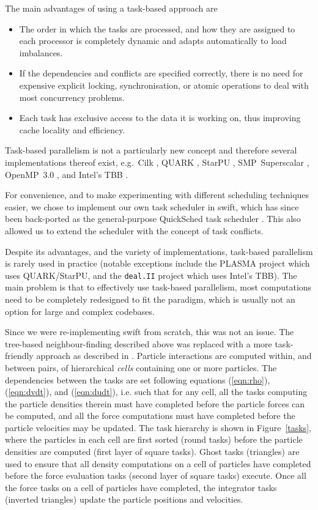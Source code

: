 \documentclass{sig-alternate-05-2015}
\newcommand{\eqn}[1] {(\ref{eqn:#1})}
\newcommand{\swift}{{\sc swift}\xspace}
\newcommand{\qs}{{\sc QuickSched}\xspace}
\begin{document}
The main advantages of using a task-based approach are
%
\begin{itemize}
    \item The order in which the tasks are processed, and how they
        are assigned to each processor is completely
        dynamic and adapts automatically to load imbalances.
    \item If the dependencies and conflicts are specified correctly,
        there is no need for expensive explicit locking, synchronisation,
        or atomic operations to deal with most concurrency problems.
    \item Each task has exclusive access to the data it is working on,
        thus improving cache locality and efficiency.
\end{itemize}
%
Task-based parallelism is not a particularly new concept and therefore
several implementations thereof exist, e.g.~Cilk \cite{ref:Blumofe1995},
QUARK \cite{ref:QUARK}, StarPU \cite{ref:Augonnet2011},
SMP~Superscalar \cite{ref:SMPSuperscalar}, OpenMP~3.0 \cite{ref:Duran2009},
and Intel's TBB \cite{ref:Reinders2007}.

For convenience, and to make experimenting with different scheduling
techniques easier, we chose to implement our own task scheduler
in \swift, which has since been back-ported as the general-purpose
\qs task scheduler \cite{gonnet2013quicksched}.
This also allowed us to extend the scheduler with the concept of
task conflicts.

Despite its advantages, and the variety of implementations,
task-based parallelism is rarely used in
practice (notable exceptions include the PLASMA project
\cite{ref:Agullo2009} which uses QUARK/StarPU, and the {\tt deal.II} project
\cite{ref:Bangerth2007} which uses Intel's TBB).
The main problem is that to effectively use task-based parallelism,
most computations need to be completely redesigned to fit the paradigm,
which is usually not an option for large and complex codebases.

Since we were re-implementing \swift from scratch, this was not an issue.
The tree-based neighbour-finding described above was replaced with a more
task-friendly approach as described in \cite{gonnet2015efficient}.
Particle interactions are computed within, and between pairs, of
hierarchical {\em cells} containing one or more particles.
The dependencies between the tasks are set following
equations \eqn{rho}, \eqn{dvdt}, and \eqn{dudt}, i.e. such that for any cell,
all the tasks computing the particle densities therein must have
completed before the particle forces can be computed, and all the
force computations must have completed before the particle velocities
may be updated.
The task hierarchy is shown in Figure~\ref{tasks}, where the particles in each
cell are first sorted (round tasks) before the particle densities
are computed (first layer of square tasks).
Ghost tasks (triangles) are used to ensure that all density computations
on a cell of particles have completed before the force evaluation tasks
(second layer of square tasks) execute.
Once all the force tasks on a cell of particles have completed,
the integrator tasks (inverted triangles) update the particle positions 
and velocities.
\end{document}

